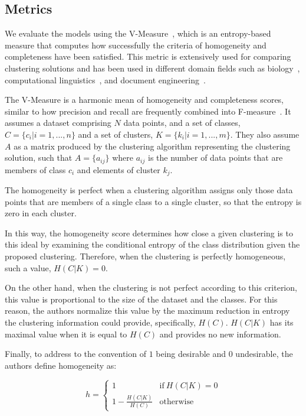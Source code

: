 \subsection{Metrics}

We evaluate the models using the V-Measure~\cite{vmeasure}, which is an entropy-based measure that computes how successfully the criteria of homogeneity and completeness have been satisfied. This metric is extensively used for comparing clustering solutions and has been used in different domain fields such as biology~\cite{bio1}, computational linguistics~\cite{nlp1}, and document engineering~\cite{doceng}.


The V-Measure is a harmonic mean of homogeneity and completeness scores, similar to how precision and recall are frequently combined into F-measure~\cite{van1979information}. It assumes a dataset comprising $N$ data points, and a set of classes, $C = \{c_i|i = 1,..., n\}$ and a set of clusters, $K = \{k_i|i = 1,...,m\}$. They also assume $A$ as a matrix produced by the clustering algorithm representing the clustering solution, such that $A = \{a_{ij}\}$ where $a_{ij}$ is the number of data points that are members of class $c_i$ and elements of cluster $k_j$.

The homogeneity is perfect when a clustering algorithm assigns only those data points that are members of a single class to a single cluster, so that the entropy is zero in each cluster.

In this way, the homogeneity score determines how close a given clustering is to this ideal by examining the conditional entropy of the class distribution given the proposed clustering. 
Therefore, when the clustering is perfectly homogeneous, such a value, $H(C|K) = 0$. 
 
On the other hand, when the clustering is not perfect according to this criterion, this value is proportional to the size of the dataset and the classes.
For this reason, the authors normalize this value by the maximum reduction in entropy the clustering information could provide, specifically, $H(C)$.
$H(C|K)$ has its maximal value when it is equal to $H(C)$ and provides no new information.

Finally, to address to the convention of $1$ being desirable and $0$ undesirable, the authors define homogeneity as:

\begin{equation}
\label{equation:homo}
    h = \begin{cases} 1 & \text{if}\ H(C|K) = 0 \\1-\frac{H(C|K)}{H(C)} & \text{otherwise}\end{cases}
\end{equation}

